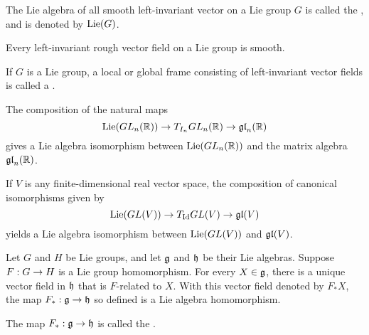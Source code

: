 \dfn The Lie algebra of all smooth left-invariant vector on a Lie group $G$ is called the , and is denoted by $\text{Lie}(G)$.

\begin{thm}
\end{thm}

\begin{cor}
Every left-invariant rough vector field on a Lie group is smooth.
\end{cor}

\dfn If $G$ is a Lie group, a local or global frame consisting of left-invariant vector fields is called a .

\begin{thm}
\end{thm}

\setcounter{thm}{40}

\begin{prop}
The composition of the natural maps
\[\text{Lie}(GL_n(\mathbb{R}))\rightarrow T_{I_n}GL_n(\mathbb{R})\rightarrow \mathfrak{gl}_n(\mathbb{R})\]
gives a Lie algebra isomorphism between $\text{Lie}(GL_n(\mathbb{R}))$ and the matrix algebra $\mathfrak{gl}_n(\mathbb{R})$.
\end{prop}

\begin{prop}
If $V$ is any finite-dimensional real vector space, the composition of canonical isomorphisms given by
\[\text{Lie}(GL(V))\rightarrow T_{\text{Id}}GL(V)\rightarrow \mathfrak{gl}(V)\]
yields a Lie algebra isomorphism between $\text{Lie}(GL(V))$ and $\mathfrak{gl}(V)$.
\end{prop}

\setcounter{thm}{43}

\begin{thm}
Let $G$ and $H$ be Lie groups, and let $\mathfrak{g}$ and $\mathfrak{h}$ be their Lie algebras. Suppose $F:G\rightarrow H$ is a Lie group homomorphism. For every $X\in \mathfrak{g}$, there is a unique vector field in $\mathfrak{h}$ that is $F$-related to $X$. With this vector field denoted by $F_*X$, the map $F_*:\mathfrak{g}\rightarrow \mathfrak{h}$ so defined is a Lie algebra homomorphism.
\end{thm}

\dfn The map $F_*:\mathfrak{g}\rightarrow\mathfrak{h}$ is called the .


